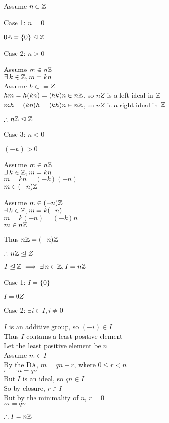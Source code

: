 \documentclass[letterpaper,12pt,fleqn]{article}
\newcommand{\ide}{\trianglelefteq}
\begin{document}
\begin{theproof}
  Assume $n\in\mathbb{Z}$
  
  \begin{description}
  \item Case 1: $n=0$
    
    $0\Z=\{0\}\ide\Z$

  \item Case 2: $n>0$

    Assume $m\in n\mathbb{Z}$ \\
    $\exists\,k\in\mathbb{Z},m=kn$ \\
    Assume $h\in=Z$ \\
    $hm=h(kn)=(hk)n\in n\mathbb{Z}$, so $nZ$ is a left ideal in $\mathbb{Z}$ \\
    $mh=(kn)h=(kh)n\in n\mathbb{Z}$, so $nZ$ is a right ideal in $\mathbb{Z}$

    $\therefore n\Z\ide\Z$

  \item Case 3: $n<0$

    $(-n)>0$

    Assume $m\in n\mathbb{Z}$ \\
    $\exists\,k\in\mathbb{Z},m=kn$ \\
    $m=kn=(-k)(-n)$ \\
    $m\in (-n)\mathbb{Z}$

    Assume $m\in(-n)\mathbb{Z}$ \\
    $\exists\,k\in\mathbb{Z},m=k(-n)$ \\
    $m=k(-n)=(-k)n$ \\
    $m\in n\mathbb{Z}$

    Thus $n\mathbb{Z}=(-n)\mathbb{Z}$

    $\therefore n\Z\ide Z$
  \end{description}
\end{theproof}

\begin{theorem}
  $I\ide\Z\implies\exists\,n\in\Z,I=n\Z$
\end{theorem}

\begin{theproof}
  \listbreak
  \begin{description}
  \item Case 1: $I=\{0\}$

    $I=0Z$

  \item Case 2: $\exists i\in I,i\ne0$

    $I$ is an additive group, so $(-i)\in I$ \\
    Thus $I$ contains a least positive element \\
    Let the least positive element be $n$ \\
    Assume $m\in I$ \\
    By the DA, $m=qn+r$, where $0\le r<n$ \\
    $r=m-qn$ \\
    But $I$ is an ideal, so $qn\in I$ \\
    So by closure, $r\in I$ \\
    But by the minimality of $n$, $r=0$ \\
    $m=qn$

    $\therefore I=n\mathbb{Z}$

  \end{description}
\end{theproof}
\end{document}
